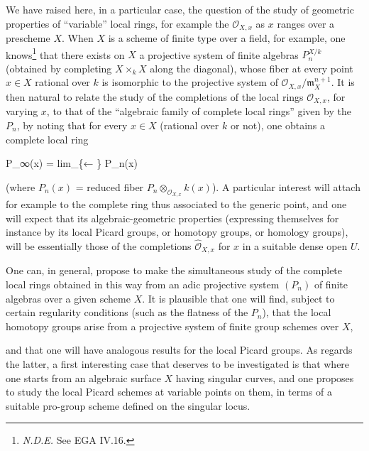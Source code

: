 \documentclass[
  11pt,
  a4paper,
]{book}
\newenvironment{Shaded}{}{}
\newcommand{\NormalTok}[1]{#1}
\begin{document}
We have raised here, in a particular case, the question of the study of
geometric properties of ``variable'' local rings, for example the
\(\mathcal{O}_{X,x}\) as \(x\) ranges over a prescheme \(X\). When \(X\)
is a scheme of finite type over a field, for example, one
knows\footnote{\emph{N.D.E.} See EGA IV.16.} that there exists on \(X\)
a projective system of finite algebras \(P^{X/k}_{n}\) (obtained by
completing \(X \times_{k} X\) along the diagonal), whose fiber at every
point \(x \in X\) rational over \(k\) is isomorphic to the projective
system of \(\mathcal{O}_{X,x}/\mathfrak{m}^{n+1}_{X}\). It is then
natural to relate the study of the completions of the local rings
\(\mathcal{O}_{X,x}\), for varying \(x\), to that of the ``algebraic
family of complete local rings'' given by the \(P_{n}\), by noting that
for every \(x \in X\) (rational over \(k\) or not), one obtains a
complete local ring

\begin{Shaded}
\begin{Highlighting}[]
\NormalTok{P\_∞(x) = lim\_\{← \} P\_n(x)}
\end{Highlighting}
\end{Shaded}

(where \(P_{n}(x)\) = reduced fiber
\(P_{n} \otimes_{\mathcal{O}_{X,x}} k(x)\)). A particular interest will
attach for example to the complete ring thus associated to the generic
point, and one will expect that its algebraic-geometric properties
(expressing themselves for instance by its local Picard groups, or
homotopy groups, or homology groups), will be essentially those of the
completions \(\hat{\mathcal{O}}_{X,x}\) for \(x\) in a suitable dense
open \(U\).

One can, in general, propose to make the simultaneous study of the
complete local rings obtained in this way from an adic projective system
\((P_{n})\) of finite algebras over a given scheme \(X\). It is
plausible that one will find, subject to certain regularity conditions
(such as the flatness of the \(P_{n}\)), that the local homotopy groups
arise from a projective system of finite group schemes over \(X\),

and that one will have analogous results for the local Picard groups. As
regards the latter, a first interesting case that deserves to be
investigated is that where one starts from an algebraic surface \(X\)
having singular curves, and one proposes to study the local Picard
schemes at variable points on them, in terms of a suitable pro-group
scheme defined on the singular locus.
\end{document}
